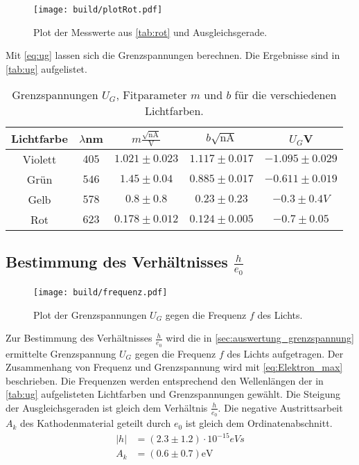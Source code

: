 \begin{figure}[H]
  \centering
  \texttt{[image: build/plotRot.pdf]}
  \caption{Plot der Messwerte aus \autoref{tab:rot} und Ausgleichsgerade.}
  \label{fig:plot_rot}
\end{figure}

Mit \autoref{eq:ug} lassen sich die Grenzspannungen berechnen. Die Ergebnisse sind in \autoref{tab:ug} aufgelistet.
\begin{table}
  \centering
  \begin{tabular}{|c|c|c|c|c|}
    \toprule
    Lichtfarbe & $λ$nm & $m\frac{\sqrt{\text{nA}}}{\text{V}}$ & $b\sqrt{\text{nA}}$ & $U_G$V\\
    \midrule
    Violett & $405$ & $1.021\pm 0.023$ & $1.117\pm 0.017$ & $-1.095\pm 0.029$\\
    Grün & $546$ & $1.45\pm 0.04$ & $0.885\pm 0.017$ & $-0.611\pm 0.019$\\
    Gelb & $578$ & $0.8\pm 0.8$ & $0.23\pm 0.23$ & $-0.3\pm 0.4V$\\
    Rot & $623$ & $0.178\pm 0.012$ & $0.124\pm 0.005$ & $-0.7\pm 0.05$\\
    \bottomrule
  \end{tabular}
  \caption{Grenzspannungen $U_G$, Fitparameter $m$ und $b$ für die verschiedenen Lichtfarben.}
  \label{tab:ug}
\end{table}
  

\newpage

\subsection{Bestimmung des Verhältnisses $\frac{h}{e_0}$}

\begin{figure}
  \centering
  \texttt{[image: build/frequenz.pdf]}
  \caption{Plot der Grenzspannungen $U_G$ gegen die Frequenz $f$ des Lichts.}
  \label{fig:frequenz}
\end{figure}

Zur Bestimmung des Verhältnisses $\frac{h}{e_0}$ wird die in \autoref{sec:auswertung_grenzspannung} ermittelte Grenzspannung $U_G$
gegen die Frequenz $f$ des Lichts aufgetragen. 
Der Zusammenhang von Frequenz und Grenzspannung wird mit \autoref{eq:Elektron_max} beschrieben.
Die Frequenzen werden entsprechend den Wellenlängen der in \autoref{tab:ug} aufgelisteten
Lichtfarben und Grenzspannungen gewählt. Die Steigung der Ausgleichsgeraden ist gleich dem Verhältnis $\frac{h}{e_0}$.
Die negative Austrittsarbeit $A_k$ des Kathodenmaterial geteilt durch $e_0$ ist gleich dem Ordinatenabschnitt.
\begin{align}
  |h| &= (2.3\pm 1.2) \cdot 10^{-15} \si{eVs} \\
  A_k &= (0.6\pm 0.7) \si{\eV}
\end{align}

